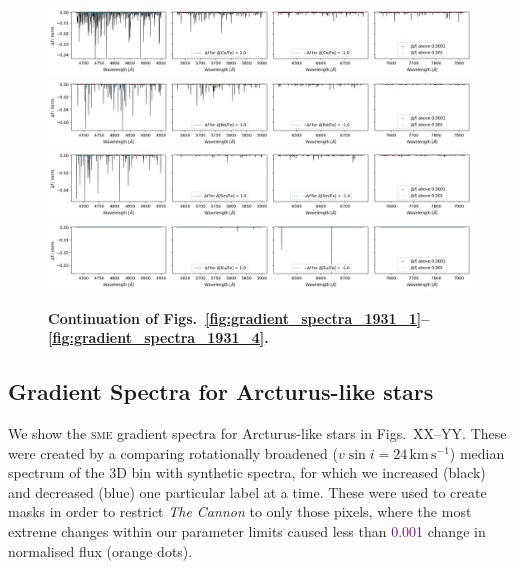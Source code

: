 \documentclass[
  journal=pasa,
  manuscript=research-paper, %
  year=2021,
  volume=37,
]{cup-journal}
\newcommand{\SB}[1]{{\textcolor{purple}{#1}}}
\newcommand{\TheCannon}{\textit{The Cannon}\xspace}
\newcommand{\sme}{\textsc{sme}\xspace}
\newcommand{\kms}{\,\mathrm{km\,s^{-1}}}	%
\begin{document}
\begin{figure}[hbt!]
 \centering  
 \includegraphics[width=\textwidth]{figures/gradient_spectrum_1931_ce_fe.png}
 \includegraphics[width=\textwidth]{figures/gradient_spectrum_1931_nd_fe.png}
 \includegraphics[width=\textwidth]{figures/gradient_spectrum_1931_sm_fe.png}
 \includegraphics[width=\textwidth]{figures/gradient_spectrum_1931_eu_fe.png}
 \caption{\textbf{Continuation of Figs.~\ref{fig:gradient_spectra_1931_1}--\ref{fig:gradient_spectra_1931_4}.}} \label{fig:gradient_spectra_1931_5}
\end{figure}

\subsection{Gradient Spectra for Arcturus-like stars}

We show the \sme gradient spectra for Arcturus-like stars in Figs.~XX--YY. These were created by a comparing rotationally broadened ($v \sin i = 24\kms$) median spectrum of the 3D bin with synthetic spectra, for which we increased (black) and decreased (blue) one particular label at a time. These were used to create masks in order to restrict \TheCannon to only those pixels, where the most extreme changes within our parameter limits caused less than \SB{0.001} change in normalised flux (orange dots).

\end{document}

